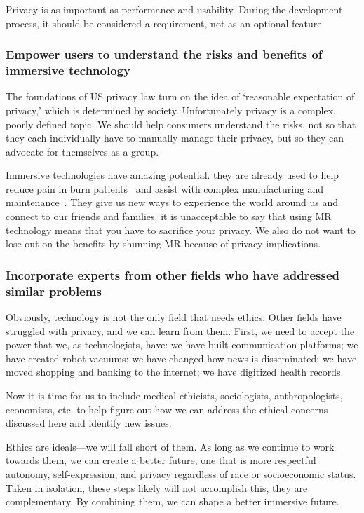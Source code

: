 Privacy is as important as performance and usability. During the development process, it should be considered a requirement, not as an optional feature.

\subsubsection{Empower users to understand the risks and benefits of immersive technology}

The foundations of US privacy law turn on the idea of `reasonable expectation of privacy,' which is determined by society. Unfortunately privacy is a complex, poorly defined topic. We should help consumers understand the risks, not so that they each individually have to manually manage their privacy, but so they can advocate for themselves as a group.

Immersive technologies have amazing potential. they are already used to help reduce pain in burn patients~\cite{hoffman2001effectiveness} and assist with complex manufacturing and maintenance~\cite{palmarini2018systematic}. They give us new ways to experience the world around us and connect to our friends and families. it is unacceptable to say that using MR technology means that you have to sacrifice your privacy. We also do not want to lose out on the benefits by shunning MR because of privacy implications.

\subsubsection{Incorporate experts from other fields who have addressed similar problems}

Obviously, technology is not the only field that needs ethics. Other fields have struggled with privacy, and we can learn from them. First, we need to accept the power that we, as technologists, have: we have built communication platforms; we have created robot vacuums; we have changed how news is disseminated; we have moved shopping and banking to the internet; we have digitized health records.

Now it is time for us to include medical ethicists, sociologists, anthropologists, economists, etc. to help figure out how we can address the ethical concerns discussed here and identify new issues.

Ethics are ideals---we will fall short of them. As long as we continue to work towards them, we can create a better future, one that is more respectful autonomy, self-expression, and privacy regardless of race or socioeconomic status. Taken in isolation, these steps likely will not accomplish this, they are complementary. By combining them, we can shape a better immersive future.